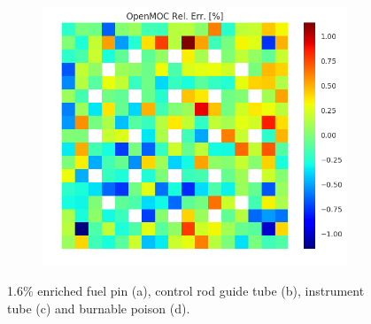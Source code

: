 \begin{figure}[h!]
\begin{subfigure}{.33\textwidth}
  \caption{}
  \label{fig:chap8-assm-1.6-degenerate-fiss-8}
\end{subfigure}%
\begin{subfigure}{.33\textwidth}
  \centering
  \includegraphics[width=\linewidth]{figures/quantification/assm-16/degenerate-fiss-err-70}
  \caption{}
  \label{fig:chap8-assm-1.6-degenerate-fiss-70}
\end{subfigure}
\caption[Fission rate errors for a 1.6\& enriched assembly]{1.6\% enriched fuel pin (a), control rod guide tube (b), instrument tube (c) and burnable poison (d).}
\label{fig:chap8-assm-1.6-fiss-err}
\end{figure}

